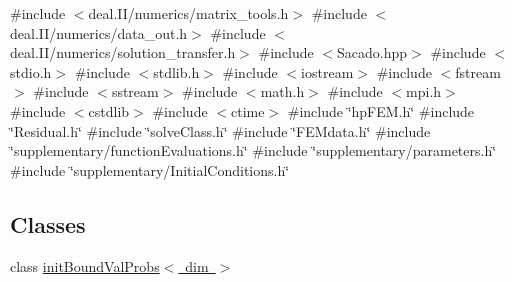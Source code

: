 {\ttfamily \#include $<$deal.\+I\+I/numerics/matrix\+\_\+tools.\+h$>$}\newline
{\ttfamily \#include $<$deal.\+I\+I/numerics/data\+\_\+out.\+h$>$}\newline
{\ttfamily \#include $<$deal.\+I\+I/numerics/solution\+\_\+transfer.\+h$>$}\newline
{\ttfamily \#include $<$Sacado.\+hpp$>$}\newline
{\ttfamily \#include $<$stdio.\+h$>$}\newline
{\ttfamily \#include $<$stdlib.\+h$>$}\newline
{\ttfamily \#include $<$iostream$>$}\newline
{\ttfamily \#include $<$fstream$>$}\newline
{\ttfamily \#include $<$sstream$>$}\newline
{\ttfamily \#include $<$math.\+h$>$}\newline
{\ttfamily \#include $<$mpi.\+h$>$}\newline
{\ttfamily \#include $<$cstdlib$>$}\newline
{\ttfamily \#include $<$ctime$>$}\newline
{\ttfamily \#include \char`\"{}hp\+F\+E\+M.\+h\char`\"{}}\newline
{\ttfamily \#include \char`\"{}Residual.\+h\char`\"{}}\newline
{\ttfamily \#include \char`\"{}solve\+Class.\+h\char`\"{}}\newline
{\ttfamily \#include \char`\"{}F\+E\+Mdata.\+h\char`\"{}}\newline
{\ttfamily \#include \char`\"{}supplementary/function\+Evaluations.\+h\char`\"{}}\newline
{\ttfamily \#include \char`\"{}supplementary/parameters.\+h\char`\"{}}\newline
{\ttfamily \#include \char`\"{}supplementary/\+Initial\+Conditions.\+h\char`\"{}}\newline
\subsection*{Classes}
\begin{DoxyCompactItemize}
\item 
class \mbox{\hyperlink{classinit_bound_val_probs}{init\+Bound\+Val\+Probs$<$ dim $>$}}
\end{DoxyCompactItemize}
